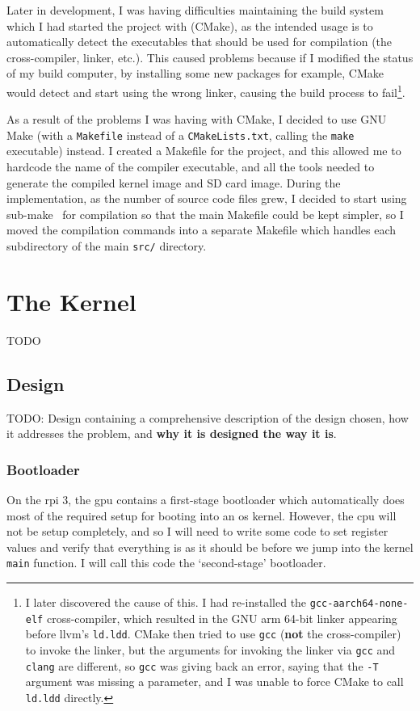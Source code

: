 \documentclass{article}
\begin{document}
Later in development, I was having difficulties maintaining the build system
which I had started the project with (CMake), as the intended usage is to
automatically detect the executables that should be used for compilation (the
cross-compiler, linker, etc.). This caused problems because if I modified the
status of my build computer, by installing some new packages for example, CMake
would detect and start using the wrong linker, causing the build process to
fail\footnote{I later discovered the cause of this. I had re-installed the
\texttt{gcc-aarch64-none-elf} cross-compiler, which resulted in the GNU
\gls{arm} 64-bit linker appearing before llvm's \texttt{ld.ldd}. CMake then
tried to use \texttt{gcc} (\textbf{not} the cross-compiler) to invoke the
linker, but the arguments for invoking the linker via \texttt{gcc} and
\texttt{clang} are different, so \texttt{gcc} was giving back an error, saying
that the \texttt{-T} argument was missing a parameter, and I was unable to
force CMake to call \texttt{ld.ldd} directly.}.

As a result of the problems I was having with CMake, I decided to use GNU Make
(with a \texttt{Makefile} instead of a \texttt{CMakeLists.txt}, calling the
\texttt{make} executable) instead. I created a Makefile for the project, and
this allowed me to hardcode the name of the compiler executable, and all the
tools needed to generate the compiled kernel image and SD card image. During
the implementation, as the number of source code files grew, I decided to start
using sub-make~\cite{sub-make} for compilation so that the main Makefile could
be kept simpler, so I moved the compilation commands into a separate Makefile
which handles each subdirectory of the main \texttt{src/} directory.

\section{The Kernel}
TODO
\subsection{Design}
TODO: Design containing a comprehensive description of the design chosen, how
it addresses the problem, and \textbf{why it is designed the way it is}.

\subsubsection{Bootloader}
On the \gls{rpi} 3, the \gls{gpu} contains a first-stage bootloader which
automatically does most of the required setup for booting into an \gls{os}
kernel. However, the \gls{cpu} will not be setup completely, and so I will need
to write some code to set register values and verify that everything is as it
should be before we jump into the kernel \texttt{main} function. I will call
this code the `second-stage' bootloader.
\end{document}
